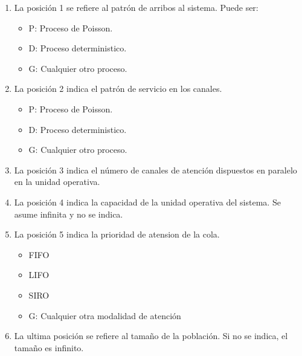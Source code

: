 \documentclass{article}
\begin{document}
\begin{enumerate}
    \item La posición 1 se refiere al patrón de arribos al sistema. Puede ser:
    \begin{itemize}
        \item P: Proceso de Poisson.
        \item D: Proceso deterministico.
        \item G: Cualquier otro proceso.
    \end{itemize}
    \item La posición 2 indica el patrón de servicio en los canales.
    \begin{itemize}
        \item P: Proceso de Poisson.
        \item D: Proceso deterministico.
        \item G: Cualquier otro proceso.
    \end{itemize}
    \item La posición 3 indica el número de canales de atención dispuestos en paralelo en la unidad operativa.
    \item La posición 4 indica la capacidad de la unidad operativa del sistema. Se asume infinita y no se indica.
    \item La posición 5 indica la prioridad de atension de la cola. 
    \begin{itemize}
        \item FIFO
        \item LIFO
        \item SIRO
        \item G: Cualquier otra modalidad de atención
    \end{itemize}
    \item La ultima posición se refiere al tamaño de la población. Si no se indica, el tamaño es infinito.
\end{enumerate}
\end{document}
